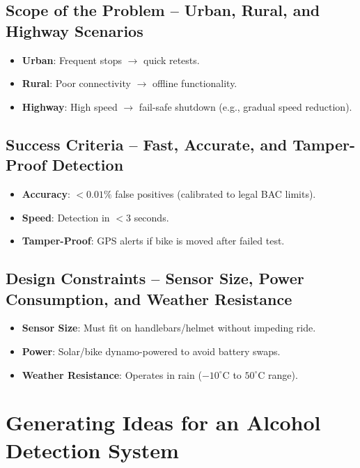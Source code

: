 \documentclass{article}
\begin{document}
\subsection{Scope of the Problem -- Urban, Rural, and Highway Scenarios}
\begin{itemize}
    \item \textbf{Urban}: Frequent stops $\rightarrow$ quick retests.
    \item \textbf{Rural}: Poor connectivity $\rightarrow$ offline functionality.
    \item \textbf{Highway}: High speed $\rightarrow$ fail-safe shutdown (e.g., gradual speed reduction).
\end{itemize}

\subsection{Success Criteria -- Fast, Accurate, and Tamper-Proof Detection}
\begin{itemize}
    \item \textbf{Accuracy}: $<0.01\%$ false positives (calibrated to legal BAC limits).
    \item \textbf{Speed}: Detection in $<3$ seconds.
    \item \textbf{Tamper-Proof}: GPS alerts if bike is moved after failed test.
\end{itemize}

\subsection{Design Constraints -- Sensor Size, Power Consumption, and Weather Resistance}
\begin{itemize}
    \item \textbf{Sensor Size}: Must fit on handlebars/helmet without impeding ride.
    \item \textbf{Power}: Solar/bike dynamo-powered to avoid battery swaps.
    \item \textbf{Weather Resistance}: Operates in rain ($-10^\circ$C to $50^\circ$C range).
\end{itemize}

\newpage

\section{Generating Ideas for an Alcohol Detection System}
\end{document}
